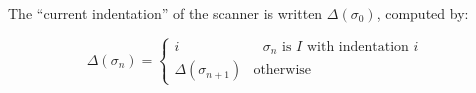 \documentclass{article}
\begin{document}
The ``current indentation'' of the scanner is written $\Delta(\sigma_0)$, computed by:

\begin{equation*}
  \Delta(\sigma_n) =
  \begin{cases}
    i                     & \text{ $\sigma_n$ is $I$ with indentation $i$ } \\
    \Delta(\sigma_{n+1})  & \text{otherwise}
  \end{cases}
\end{equation*}

\begin{algorithm}[H]

\newcommand{\commentfont}{\relsize{-1}\color{commentcolor}\it}
\SetArgSty{}

\SetStartEndCondition{ }{}{}%
%
%
%

\DontPrintSemicolon
\SetAlgoVlined



\end{algorithm}
\end{document}
